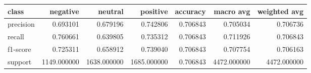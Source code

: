\begin{tabular}{lrrrrrr}
\toprule
class & negative & neutral & positive & accuracy & macro avg & weighted avg \\
\midrule
precision & 0.693101 & 0.679196 & 0.742806 & 0.706843 & 0.705034 & 0.706736 \\
recall & 0.760661 & 0.639805 & 0.735312 & 0.706843 & 0.711926 & 0.706843 \\
f1-score & 0.725311 & 0.658912 & 0.739040 & 0.706843 & 0.707754 & 0.706163 \\
support & 1149.000000 & 1638.000000 & 1685.000000 & 0.706843 & 4472.000000 & 4472.000000 \\
\bottomrule
\end{tabular}
